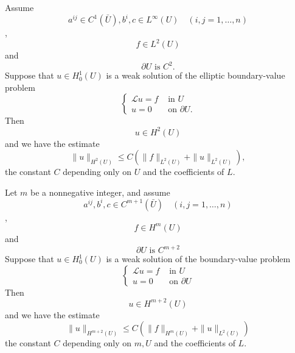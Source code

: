 \begin{theorem}
    Assume
    \begin{equation*}
        a^{i j} \in C^1(\bar{U}), b^i, c \in L^{\infty}(U) \quad(i, j=1, \ldots, n)
    \end{equation*}
    ,
    \begin{equation*}
        f \in L^2(U)
    \end{equation*}
    and
    \begin{equation*}
        \partial U \text { is } C^2 .
    \end{equation*}
    Suppose that $u \in H_0^1(U)$ is a weak solution of the elliptic boundary-value problem
    \begin{equation*}
        \left\{
        \begin{aligned}
            \mathcal{L}u=f & \text { in } U            \\
            u=0            & \text { on } \partial U .
        \end{aligned}
        \right.
    \end{equation*}
    Then
    \begin{equation*}
        u \in H^2(U)
    \end{equation*}
    and we have the estimate
    \begin{equation*}
        \|u\|_{H^2(U)} \leq C\left(\|f\|_{L^2(U)}+\|u\|_{L^2(U)}\right),
    \end{equation*}
    the constant $C$ depending only on $U$ and the coefficients of $L$.
\end{theorem}
\begin{theorem}
    Let $m$ be a nonnegative integer, and assume
    \begin{equation*}
        a^{i j}, b^i, c \in C^{m+1}(\bar{U}) \quad(i, j=1, \ldots, n)
    \end{equation*}
    ,
    \begin{equation*}
        f \in H^m(U)
    \end{equation*}
    and
    \begin{equation*}
        \partial U \text { is } C^{m+2}
    \end{equation*}
    Suppose that $u \in H_0^1(U)$ is a weak solution of the boundary-value problem
    \begin{equation*}
        \left\{
        \begin{aligned}
            \mathcal{L}u=f & \text { in } U          \\
            u=0            & \text { on } \partial U
        \end{aligned}
        \right.
    \end{equation*}
    Then
    \begin{equation*}
        u \in H^{m+2}(U)
    \end{equation*}
    and we have the estimate
    \begin{equation*}
        \|u\|_{H^{m+2}(U)} \leq C\left(\|f\|_{H^m(U)}+\|u\|_{L^2(U)}\right)
    \end{equation*}
    the constant $C$ depending only on $m, U$ and the coefficients of $L$.
\end{theorem}
